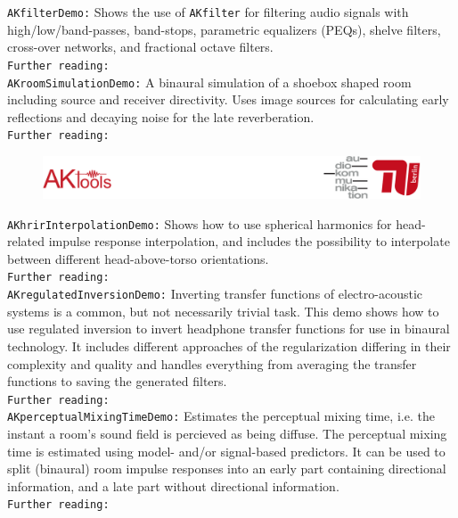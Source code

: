 \documentclass[11pt]{scrartcl}
\begin{document}
\noindent
{\color{tu_red}\texttt{AKfilterDemo:}} Shows the use of \texttt{AKfilter} for filtering audio signals with high/low/band-passes, band-stops, parametric equalizers (PEQs), shelve filters, cross-over networks, and fractional octave filters.\\
\texttt{Further reading:} \citet{Zoelzer2002, Bristow1994, Bohn2005}\\

\noindent
{\color{tu_red}\texttt{AKroomSimulationDemo:}} A binaural simulation of a shoebox shaped room including source and receiver directivity. Uses image sources for calculating early reflections and decaying noise for the late reverberation.\\
\texttt{Further reading:} \citet{Brinkmann2018}\\

\vfill
\begin{figure}[b!]
  \center
  \includegraphics[width=1\textwidth]{logo_footer}
\end{figure}

\clearpage

\noindent
{\color{tu_red}\texttt{AKhrirInterpolationDemo:}} Shows how to use spherical harmonics for head-related impulse response interpolation, and includes the possibility to interpolate between different head-above-torso orientations.\\
\texttt{Further reading:} \citet{Brinkmann2015}\\

\noindent
{\color{tu_red}\texttt{AKregulatedInversionDemo:}} Inverting transfer functions of electro-acoustic systems is a common, but not necessarily trivial task. This demo shows how to use regulated inversion to invert headphone transfer functions for use in binaural technology. It includes different approaches of the regularization differing in their complexity and quality and handles everything from averaging the transfer functions to saving the generated filters.\\
\texttt{Further reading:} \citet{Kirkeby1999, Norcross2006, Scharer2009, Lindau2012}\\

\noindent
{\color{tu_red}\texttt{AKperceptualMixingTimeDemo:}} Estimates the perceptual mixing time, i.e.  the instant a room's sound field is percieved as being diffuse. The perceptual mixing time is estimated using model- and/or signal-based predictors. It can be used to split (binaural) room impulse responses into an early part containing directional information, and a late part without directional information.\\
\texttt{Further reading:} \citet{Lindau2012b, Abel2006}\\ 
\end{document}
